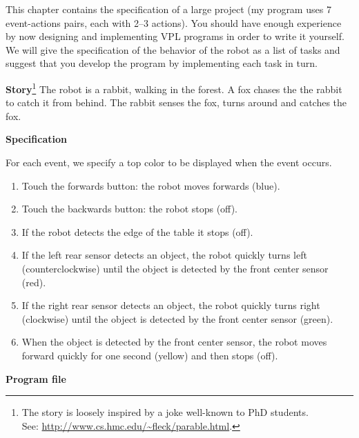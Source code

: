 \label{ch.rabbit}

This chapter contains the specification of a large project (my program
uses 7 event-actions pairs, each with 2--3 actions). You should have
enough experience by now designing and implementing VPL programs in
order to write it yourself. We will give the specification of the
behavior of the robot as a list of tasks and suggest that you develop
the program by implementing each task in turn.


\textbf{Story}\footnote{The story is loosely inspired by a joke
well-known to PhD students.\\ See:
\url{http://www.cs.hmc.edu/~fleck/parable.html}.} The robot is a rabbit,
walking in the forest. A fox chases the the rabbit to catch
it from behind. The rabbit senses the fox, turns around and catches the
fox.


\textbf{Specification}

For each event, we specify a top color to be displayed when the event occurs.

\begin{enumerate}
\item Touch the forwards button: the robot moves forwards (blue).
\item Touch the backwards button: the robot stops (off).
\item If the robot detects the edge of the table it stops (off).
\item If the left rear sensor detects an object, the robot quickly turns
left (counterclockwise) until the object is detected by the front center
sensor (red).
\item If the right rear sensor detects an object, the robot quickly turns
right (clockwise) until the object is detected by the front center
sensor (green).
\item When the object is detected by the front center sensor, the robot
moves forward quickly for one second (yellow) and then stops (off).
\end{enumerate}

{\raggedleft \hfill \textbf{Program file} }
